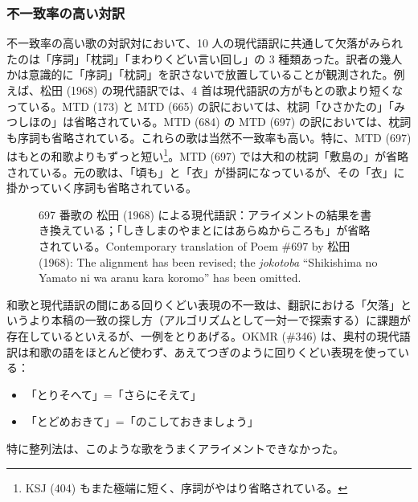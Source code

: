 \documentclass[
  letterpaper,
  DIV=11,
  numbers=noendperiod]{scrartcl}
\providecommand{\tightlist}{%
  \setlength{\itemsep}{0pt}\setlength{\parskip}{0pt}}\usepackage{longtable,booktabs,array}
\begin{document}
\subsubsection*{不一致率の高い対訳}\label{ux4e0dux4e00ux81f4ux7387ux306eux9ad8ux3044ux5bfeux8a33}

不一致率の高い歌の対訳対において、10
人の現代語訳に共通して欠落がみられたのは「序詞」「枕詞」「まわりくどい言い回し」の
3
種類あった。訳者の幾人かは意識的に「序詞」「枕詞」を訳さないで放置していることが観測された。例えば、松田
(1968) の現代語訳では、4
首は現代語訳の方がもとの歌より短くなっている。MTD (173) と MTD (665)
の訳においては、枕詞「ひさかたの」「みつしほの」は省略されている。MTD
(684) の MTD (697)
の訳においては、枕詞も序詞も省略されている。これらの歌は当然不一致率も高い。特に、MTD
(697) はもとの和歌よりもずっと短い\footnote{KSJ (404)
  もまた極端に短く、序詞がやはり省略されている。}。MTD (697)
では大和の枕詞「敷島の」が省略されている。元の歌は、「頃も」と「衣」が掛詞になっているが、その「衣」に掛かっていく序詞も省略されている。

\begin{figure}


\caption{\label{fig-mtd-697}697 番歌の 松田 (1968)
による現代語訳：アライメントの結果を書き換えている；「しきしまのやまとにはあらぬからころも」が省略されている。Contemporary
translation of Poem \#697 by 松田 (1968): The alignment has been
revised; the \emph{jokotoba} ``Shikishima no Yamato ni wa aranu kara
koromo'' has been omitted.}

\end{figure}%

和歌と現代語訳の間にある回りくどい表現の不一致は、翻訳における「欠落」というより本稿の一致の探し方（アルゴリズムとして一対一で探索する）に課題が存在しているといえるが、一例をとりあげる。OKMR
(\#346)
は、奥村の現代語訳は和歌の語をほとんど使わず、あえてつぎのように回りくどい表現を使っている：

\begin{itemize}
\tightlist
\item
  「とりそへて」=「さらにそえて」
\item
  「とどめおきて」=「のこしておきましょう」
\end{itemize}

特に整列法は、このような歌をうまくアライメントできなかった。
\end{document}
